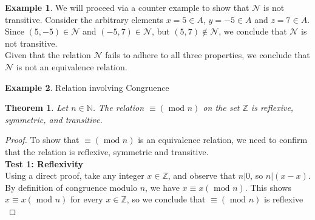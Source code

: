 \documentclass{book}
\newtheorem{theorem}{Theorem}[section]
\theoremstyle{definition}
\newtheorem{example}{Example}[definition]
\theoremstyle{remark}
\newcommand{\bb}[1]{\mathbb{#1}}
\newcommand{\cc}[1]{\mathcal{#1}}
\begin{document}
\begin{example}
                We will proceed via a counter example to show that $\cc{N}$ is not transitive. Consider the arbitrary elements $x = 5 \in A$, $y = - 5 \in A$ and $z = 7 \in A$. Since $(5,-5) \in \cc{N}$ and $(-5, 7) \in \cc{N}$, but $(5,7) \notin \cc{N}$, we conclude that $\cc{N}$ is not transitive. \\
                 
            Given that the relation $\cc{N}$ fails to adhere to all three properties, we conclude that $\cc{N}$ is not an equivalence relation. \\
    \end{example}


    \newpage
    \begin{example}
        Relation involving Congruence \\
        
        \begin{tcolorbox}
            \begin{theorem}
                Let $n \in \bb{N}$. The relation $\equiv (\text{ mod } n)$ on the set $\bb{Z}$ is reflexive, symmetric, and transitive.
            \end{theorem}
        \end{tcolorbox}
    
    
        \begin{proof}
             To show that $\equiv (\text{ mod } n)$ is an equivalence relation, we need to confirm that the relation is reflexive, symmetric and transitive. \\
             
            \textbf{Test 1: Reflexivity } \\    
                Using a direct proof, take any integer $x \in \bb{Z}$, and observe that $n|0$, so $n|(x-x)$. By definition of congruence modulo $n$, we have $x \equiv x (\text{ mod } n)$. This shows $x \equiv x (\text{ mod } n)$ for every $x \in \bb{Z}$, so we conclude that $\equiv (\text{ mod } n)$ is reflexive \\
    

\end{proof}
\end{example}
\end{document}
